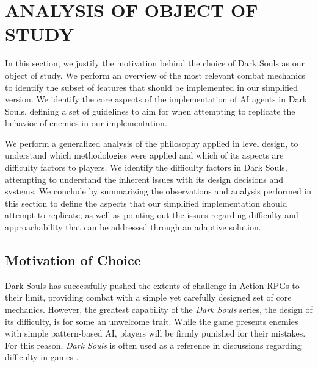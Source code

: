\chapter{ANALYSIS OF OBJECT OF STUDY}
\label{ch:analysis-object-study}
\label{sec:analysis-dark-souls}

In this section, we justify the motivation behind the choice of Dark Souls as our object of study. We perform an overview of the most relevant combat mechanics to identify the subset of features that should be implemented in our simplified version. We identify the core aspects of the implementation of AI agents in Dark Souls, defining a set of guidelines to aim for when attempting to replicate the behavior of enemies in our implementation.

We perform a generalized analysis of the philosophy applied in level design, to understand which methodologies were applied and which of its aspects are difficulty factors to players. We identify the difficulty factors in Dark Souls, attempting to understand the inherent issues with its design decisions and systems. We conclude by summarizing the observations and analysis performed in this section to define the aspects that our simplified implementation should attempt to replicate, as well as pointing out the issues regarding difficulty and approachability that can be addressed through an adaptive solution.


\section{Motivation of Choice}

Dark Souls has successfully pushed the extents of challenge in Action RPGs to their limit, providing combat with a simple yet carefully designed set of core mechanics. However, the greatest capability of the \emph{Dark Souls} series, the design of its difficulty, is for some an unwelcome trait. While the game presents enemies with simple pattern-based AI, players will be firmly punished for their mistakes. For this reason, \emph{Dark Souls} is often used as a reference in discussions regarding difficulty in games \cite{URL_ExploringDesignOfDarkSouls}.

